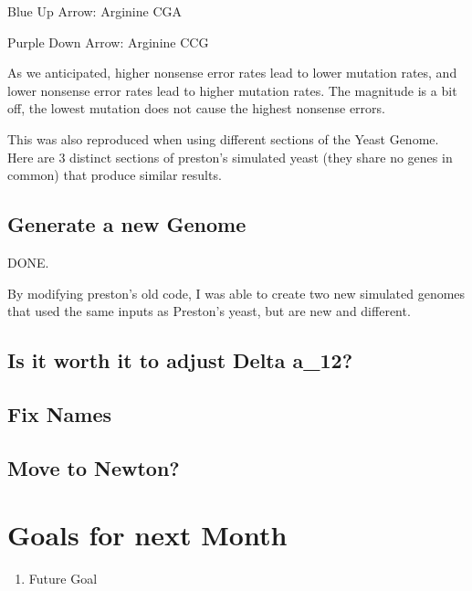 Blue Up Arrow: Arginine CGA

Purple Down Arrow: Arginine CCG

As we anticipated, higher nonsense error rates lead to lower mutation rates, and lower nonsense error rates lead to higher mutation rates. The magnitude is a bit off, the lowest mutation does not cause the highest nonsense errors.

This was also reproduced when using different sections of the Yeast Genome. Here are 3 distinct sections of preston's simulated yeast (they share no genes in common) that produce similar results.






\subsection{Generate a new Genome}

DONE.

By modifying preston's old code, I was able to create two new simulated genomes that used the same inputs as Preston's yeast, but are new and different.


\subsection{Is it worth it to adjust Delta a\_12?}

\subsection{Fix Names}

\subsection{Move to Newton?}




\section{Goals for next Month}
\begin{enumerate}
\item Future Goal
\end{enumerate}


